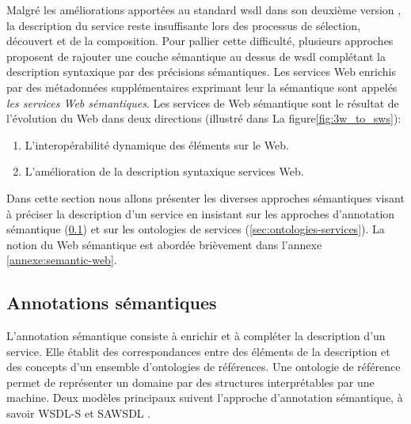 

Malgré les améliorations apportées au standard \acrshort{wsdl} dans
son deuxième version \cite{chinnici2007web}, la description du service
reste insuffisante lors des processus de sélection, découvert et de la
composition. Pour pallier cette difficulté, plusieurs approches
\cite{sivashanmugam2003adding,mcilraith2001semantic,
  mcilraith2003bringing, fensel2002web, paolucci2002semantic}
proposent de rajouter une couche sémantique au dessus de
\acrshort{wsdl} complétant la description syntaxique par des
précisions sémantiques. Les services Web enrichis par des métadonnées
supplémentaires exprimant leur la sémantique sont appelés \textit{les
  services Web sémantiques}. Les services de Web sémantique sont le
résultat de l'évolution du Web dans deux directions
\cite{bartalos2011effective} (illustré dans La
figure\ref{fig:3w_to_sws}):

\begin{enumerate}
\item L'interopérabilité dynamique des éléments sur le Web.
  
\item L'amélioration de la description syntaxique services Web.
\end{enumerate}


Dans cette section nous allons présenter les diverses approches
sémantiques visant à préciser la description d'un service en insistant
sur les approches d'annotation sémantique
(\ref{sec:semantic-annotation}) et sur les ontologies de services
(\ref{sec:ontologies-services}). La notion du Web sémantique est
abordée brièvement dans l'annexe \ref{annexe:semantic-web}.

  \subsection{Annotations sémantiques}
  \label{sec:semantic-annotation}
  L'annotation sémantique consiste à enrichir et à compléter la
  description d'un service. Elle établit des correspondances entre des
  éléments de la description et des concepts d'un ensemble
  d'ontologies de références. Une ontologie de référence permet de
  représenter un domaine par des structures interprétables par une
  machine. Deux modèles principaux suivent l'approche d'annotation
  sémantique, à savoir \textsc{WSDL-S} et \textsc{SAWSDL}
  \cite{elie2010}.

